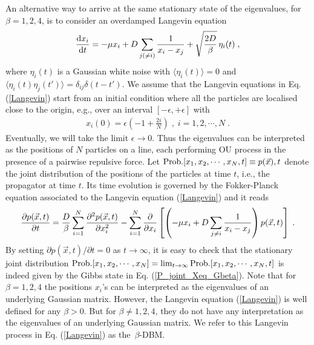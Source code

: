 \documentclass[onecolumn,superscriptaddress,
 amsmath,amssymb,
 aps,
 prd,
]{revtex4-1}
\newcommand{\bea}{\begin{eqnarray}}
\newcommand{\eea}{\end{eqnarray}}
\begin{document}
\vspace*{0.3cm}
An alternative way to arrive at the same stationary state of the eigenvalues, for $\beta = 1,2,4$, is to consider an overdamped Langevin equation~\cite{D62} 
\begin{equation} \label{Langevin}
\dv{x_i}{t} = - \mu x_i + D \sum_{j (\neq i)} \frac{1}{x_i - x_j} + \sqrt{\frac{2 D}{\beta}} \, \eta_i(t) \;,
\end{equation}
where $\eta_i(t)$ is a Gaussian white noise with $\langle \eta_i(t) \rangle = 0$ and $\langle \eta_i(t) \eta_j(t') \rangle = \delta_{ij} \delta(t - t')$. We assume that the Langevin equations in Eq. (\ref{Langevin}) start from an initial condition where all the particles are localised close to the origin, e.g., over an interval $[-\epsilon,+\epsilon]$ with 
\bea \label{IC}
x_i(0) = \epsilon\left(-1 + \frac{2i}{N} \right) \;, \; i =1,2, \cdots, N \;.
\eea
Eventually, we will take the limit $\epsilon \to 0$. Thus the eigenvalues can be interpreted as the positions of $N$ particles on a line, each performing OU process in the presence of a pairwise repulsive force. Let ${\rm Prob.}[x_1, x_2, \cdots, x_N,t] \equiv p(\vec{x}),t$ denote the joint distribution of the positions of the particles at time $t$, i.e., the propagator at time $t$. Its time evolution is governed by the Fokker-Planck equation associated to the Langevin equation (\ref{Langevin}) and it reads
\begin{equation} \label{eq:FP-DBM_text}
\pdv{p(\vec{x}, t)}{t} = \frac{D}{\beta} \sum_{i = 1}^N \pdv[2]{p(\vec{x}, t)}{x_i} - \sum_{i = 1}^N \pdv{}{x_i} \left[\left(-\mu x_i + D \sum_{j \neq i} \frac{1}{x_i - x_j} \right) p(\vec{x}, t) \right] \;.
\end{equation}
By setting $\partial{p(\vec{x}, t)}/{\partial t} = 0$ as $t \to \infty$, it is easy to check that the stationary joint distribution ${\rm Prob.}[x_1, x_2, \cdots, x_N] = \lim_{t \to \infty} {\rm Prob.}[x_1, x_2, \cdots, x_N,t]$ is indeed given by the Gibbs state in Eq. (\ref{P_joint_Xeq_Gbeta}). Note that for $\beta = 1,2,4$ the positions $x_i$'s can be interpreted as the eigenvalues of an underlying Gaussian matrix. However, the Langevin equation (\ref{Langevin}) is well defined for any $\beta > 0$. But for $\beta \neq 1,2,4$, they do not have any interpretation as the eigenvalues of an underlying Gaussian matrix. We refer to this Langevin process in Eq. (\ref{Langevin}) as the~$\beta$-DBM. 
\end{document}
